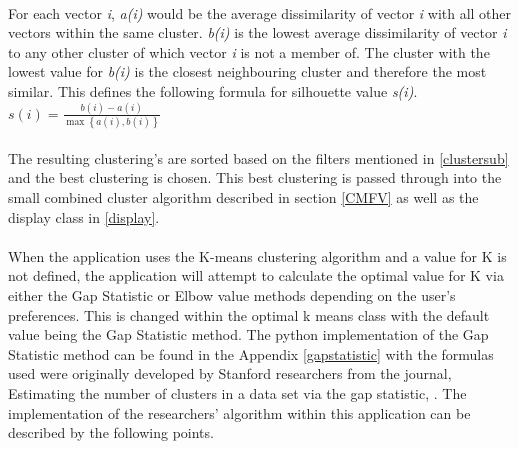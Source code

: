 \paragraph{}For each vector \textit{i}, \textit{a(i)} would be the average dissimilarity of vector \textit{i} with all other vectors within the same cluster. \textit{b(i)} is the lowest average dissimilarity of vector \textit{i} to any other cluster of which vector \textit{i} is not a member of. The cluster with the lowest value for \textit{b(i)} is the closest neighbouring cluster and therefore the most similar. This defines the following formula for silhouette value \textit{s(i)}.\linebreak
$s\left( i \right) = \frac{{b\left( i \right) - a\left( i \right)}}{{\max \left\{ {a\left( i \right),b\left( i \right)} \right\}}}$


\paragraph{}The resulting clustering’s are sorted based on the filters mentioned in \ref{clustersub} and the best clustering is chosen. This best clustering is passed through into the small combined cluster algorithm described in section \ref{CMFV} as well as the display class in \ref{display}.

\paragraph{}When the application uses the K-means clustering algorithm and a value for K is not defined, the application will attempt to calculate the optimal value for K via either the Gap Statistic or Elbow value methods depending on the user’s preferences. This is changed within the optimal k means class with the default value being the Gap Statistic method. The python implementation of the Gap Statistic method can be found in the Appendix \ref{gapstatistic} with the formulas used were originally developed by Stanford researchers from the journal, Estimating the number of clusters in a data set via the gap statistic, \cite{gapref}. The implementation of the researchers’ algorithm within this application can be described by the following points.

